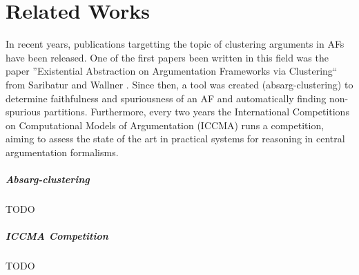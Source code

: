 \chapter{Related Works}
In recent years, publications targetting the topic of clustering arguments in AFs have been released. One of the first papers been written in this field was the paper ''Existential Abstraction on Argumentation Frameworks via Clustering`` from Saribatur and Wallner \cite{DBLP:conf/kr/SaribaturW21}. Since then, a tool was created (absarg-clustering)\cite{GitHub:repoRelatedTool} to determine faithfulness and spuriousness of an AF and automatically finding non-spurious partitions. Furthermore, every two years the International Competitions on Computational Models of Argumentation (ICCMA) \cite{COMP:ICCMA2023} runs a competition, aiming to assess the state of the art in practical systems for reasoning in central argumentation formalisms.

\paragraph{Absarg-clustering} TODO

\paragraph{ICCMA Competition} TODO
